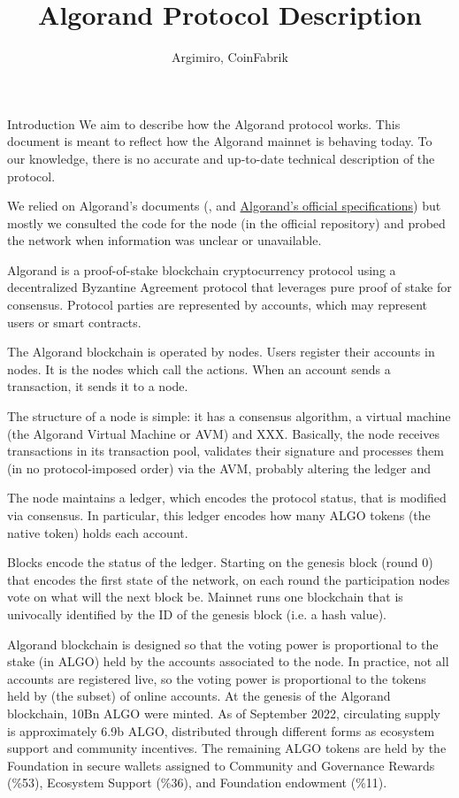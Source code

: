 \documentclass[10pt,a4paper]{article}
\author{Argimiro, CoinFabrik}
\title{Algorand Protocol Description}
\begin{document}
\maketitle
\tableofcontents

\begin{section}{Introduction}
We aim to describe how the Algorand protocol works. 
This document is meant to reflect how the Algorand mainnet is behaving
today. 
To our knowledge, there is no accurate and up-to-date technical description 
of the protocol. 

We relied on Algorand's documents (\cite{DBLP:conf/sosp/GiladHMVZ17},
\cite{DBLP:journals/corr/Micali16} and
\href{https://github.com/algorandfoundation/specs}{Algorand's official specifications})
but mostly we consulted the code for the node (in the official repository) and probed 
the network when information was unclear or unavailable.

Algorand is a proof-of-stake blockchain cryptocurrency protocol 
using a decentralized By\-zan\-tine Agreement protocol that leverages 
pure proof of stake for consensus. 
Protocol parties are represented by accounts, which may represent users
or smart contracts. 

The Algorand blockchain is operated by nodes. Users register their accounts 
in nodes. It is the nodes which call the actions. 
When an account sends a transaction, it sends it to a node. 

The structure of a node is simple: 
it has a consensus algorithm,
a virtual machine (the Algorand Virtual Machine or AVM) and 
XXX.
Basically, the node receives transactions in its transaction pool,
validates their signature and processes them (in no protocol-imposed order)
via the AVM, probably altering the ledger and 

The node maintains a ledger, which encodes the protocol status,
that is modified via consensus.
In particular, this ledger encodes how many {\sf ALGO tokens} 
(the native token) holds each account.

Blocks encode the status of the ledger. Starting on the genesis
block (round 0) that encodes the first state of the network, 
on each round the participation nodes vote on what will the next
block be. 
Mainnet runs one blockchain that is univocally identified by the ID of
the genesis block (i.e. a hash value).

Algorand blockchain is designed so that the voting power is proportional
to the stake (in {\sf ALGO}) held by the accounts associated to the node.
In practice, not all accounts are registered live, so the voting power
is proportional to the tokens held by (the subset) of online accounts.
At the genesis of the Algorand blockchain, 10Bn {\sf ALGO} were minted. 
As of September 2022, circulating supply is approximately 6.9b {\sf ALGO}, 
distributed through different forms as ecosystem support and community
incentives.
The remaining {\sf ALGO} tokens are held by the Foundation in secure wallets 
assigned to 
Community and Governance Rewards (\%53), 
Ecosystem Support (\%36), and 
Foundation endowment (\%11).


\end{section}
\end{document}
